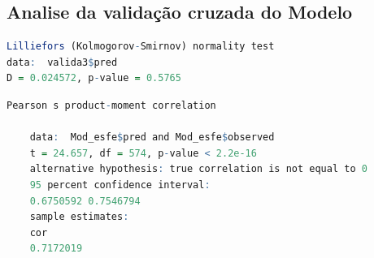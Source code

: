  \subsection{Analise da validação cruzada do Modelo }
 
   \lstset{
 	language=R, %
 	caption= Resultado do Teste Lilliefors (Kolmogorov\_Smirnov) R,} %
 \begin{lstlisting}[language=R]
	Lilliefors (Kolmogorov-Smirnov) normality test
data:  valida3$pred
D = 0.024572, p-value = 0.5765 \end{lstlisting} 
 
   \lstset{
 	language=R, %
 	caption= Resultado do Teste de Correlação em linguagem R,} %
 \begin{lstlisting}[language=R]	
 	Pearson s product-moment correlation
 	
 	data:  Mod_esfe$pred and Mod_esfe$observed
 	t = 24.657, df = 574, p-value < 2.2e-16
 	alternative hypothesis: true correlation is not equal to 0
 	95 percent confidence interval:
 	0.6750592 0.7546794
 	sample estimates:
 	cor 
 	0.7172019  \end{lstlisting}   
 

